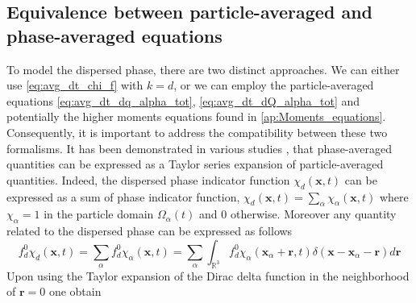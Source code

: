 
\subsection{Equivalence between particle-averaged and phase-averaged equations}
\label{sec:equivalence}
To model the dispersed phase, there are two distinct approaches. 
We can either use \ref{eq:avg_dt_chi_f} with $k=d$, or we can employ the particle-averaged equations \ref{eq:avg_dt_dq_alpha_tot}, \ref{eq:avg_dt_dQ_alpha_tot} and potentially the higher moments equations found in \ref{ap:Moments_equations}.
Consequently, it is important to address the compatibility between these two formalisms.
It has been demonstrated in various studies \citep{buyevich1979flow,lhuillier1992ensemble,jackson1997locally,zhang1994averaged}, that phase-averaged quantities can be expressed as a Taylor series expansion of particle-averaged quantities. 
Indeed, the dispersed phase indicator function $\chi_d(\textbf{x},t)$ can be expressed as a sum of phase indicator function, $\chi_d(\textbf{x},t) = \sum_\alpha\chi_\alpha(\textbf{x},t)$ where $\chi_\alpha =1$ in the particle domain $\Omega_\alpha(t)$ and $0$ otherwise. 
Moreover any quantity related to the dispersed phase can be expressed as follows
\begin{equation*}
    f^0_d \chi_d(\textbf{x},t)
    = \sum_\alpha f^0_d \chi_\alpha(\textbf{x},t) 
    = \sum_\alpha \int_{\mathbb{R}^3} f^0_d \chi_\alpha(\textbf{x}_\alpha+\textbf{r},t)\delta(\textbf{x}- \textbf{x}_\alpha - \textbf{r}) d\textbf{r} 
    \label{eq:taylor_f_d}
\end{equation*}
Upon using the Taylor expansion of the Dirac delta function in the neighborhood of $\textbf{r}=0$ one obtain
